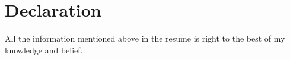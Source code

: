 \documentclass[]{deedy-resume-openfont}
\begin{document}
\begin{minipage}[t]{0.66\textwidth}
\sectionsep
\section{Declaration}
All the information mentioned above in the resume is right to the best of my knowledge and belief.
\sectionsep



\end{minipage} 
\end{document}
